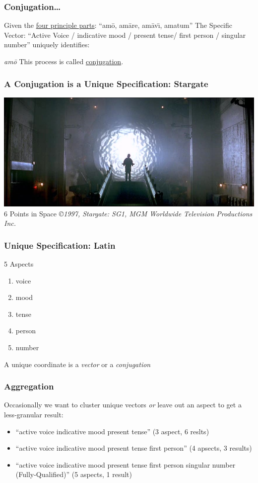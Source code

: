 \documentclass[slidestop,compress,mathserif]{beamer}
\begin{document}
\begin{frame}
	\frametitle{Conjugation\ldots}
	Given the \underline{four principle parts}:  ``am\={o}, am\={a}re, am\={a}v\={\i}, amatum''
	\vskip 0.5cm
	The Specific Vector: ``Active Voice / indicative mood / present tense/ first person / singular number'' uniquely identifies:
	\vskip 0.5cm
	\begin{center}
		\emph{am\={o}}
		\vskip 0.5cm
		This process is called \underline{conjugation}.
	\end{center}
\end{frame}

\begin{frame}
	\frametitle{A Conjugation is a Unique Specification:  Stargate}
	\begin{center}
		\includegraphics[scale=0.25]{img/stargate.jpg}
		\vskip 0.5cm
		6 Points in Space
		\vskip 0.5cm
		\emph{\copyright 1997, \emph{Stargate:  SG1},  MGM Worldwide Television Productions Inc.}
	\end{center}
\end{frame}

\begin{frame}
	\frametitle{Unique Specification:  Latin}
	5 Aspects
	\begin{enumerate}
		\item voice
		\pause
		\item mood
		\pause
		\item tense
		\pause
		\item person
		\pause
		\item number
		\pause
	\end{enumerate}
	\vskip 0.5cm
	A unique coordinate is a \emph{vector} or a \emph{conjugation}
\end{frame}

\begin{frame}
	\frametitle{Aggregation}
	Occasionally we want to cluster unique vectors \emph{or} leave out an aspect to get a less-granular result:
	\pause
	\begin{itemize}
		\item ``active voice indicative mood present tense'' (3 aspect, 6 reslts)
		\pause
		\item ``active voice indicative mood present tense first person'' (4 apsects, 3 results)
		\pause
		\item ``active voice indicative mood present tense first person singular number (Fully-Qualified)'' (5 aspects, 1 result)
	\end{itemize}
\end{frame}
\end{document}
